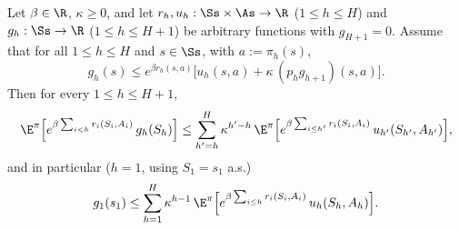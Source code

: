 \begin{lemma}\label{lem:unroll_recursion}
\leanok
{}
Let $\beta \in \R$, $\kappa \ge 0$, and let $r_h, u_h : \Ss \times \As \to \R$ ($1 \le h \le H$)
and $g_h : \Ss \to \R$ ($1 \le h \le H + 1$) be arbitrary functions with $g_{H+1} = 0$. Assume
that for all $1 \le h \le H$ and $s \in \Ss$, with $a := \pi_h(s)$,
\[
  g_h(s) \le e^{\beta r_h(s,a)}\Big[u_h(s,a) + \kappa\,(p_h g_{h+1})(s,a)\Big] .
\]
Then for every $1 \le h \le H + 1$,
\begin{equation}\label{eq:pmdp_unroll_ih}
  \E^\pi\Big[e^{\beta\sum_{i < h} r_i(S_i, A_i)}\,g_h(S_h)\Big]
  \le \sum_{h' = h}^{H}\kappa^{h' - h}\,\E^\pi\Big[e^{\beta\sum_{i \le h'} r_i(S_i,A_i)}\,u_{h'}(S_{h'}, A_{h'})\Big] ,
\end{equation}
and in particular ($h = 1$, using $S_1 = s_1$ a.s.)
\[
  g_1(s_1) \le \sum_{h = 1}^{H}\kappa^{h - 1}\,\E^\pi\Big[e^{\beta\sum_{i \le h} r_i(S_i,A_i)}\,u_h(S_h, A_h)\Big] .
\]
\end{lemma}


